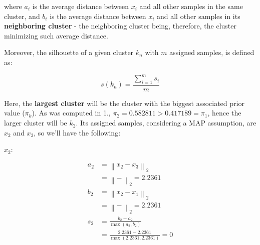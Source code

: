 \documentclass[12pt]{article}
\begin{document}
\begin{enumerate}[leftmargin=\labelsep]
\begin{enumerate}[leftmargin=\labelsep]
                where $a_i$ is the average distance between $x_i$ and all other samples
                in the same cluster, and $b_i$ is the average distance between $x_i$ and all
                other samples in its \textbf{neighboring cluster} - the neighboring
                cluster being, therefore, the cluster minimizing such average distance.

                Moreover, the silhouette of a given cluster $k_n$ with $m$ assigned samples, is defined as:

                \begin{equation*}
                  s(k_n) = \frac{\sum_{i=1}^m s_i}{m}
                \end{equation*}

                Here, the \textbf{largest cluster} will be the cluster with the
                biggest associated prior value ($\pi_k$). As was computed in 1.,
                $\pi_2 = 0.582811 > 0.417189 = \pi_1$,
                hence the larger cluster will be $k_2$. Its assigned samples,
                considering a MAP assumption, are $x_2$ and $x_3$, so we'll have
                the following:

                \vspace*{0.5cm}

                \begin{paracol}{2}
                  \setlength{\columnseprule}{1pt}
                  \def\columnseprulecolor{\color{black}}
                  \centering

                  $x_2$:

                  \begin{equation*}
                    \begin{aligned}
                      a_2 & = \left\| x_2 - x_3 \right\|_2                                           \\
                          & = \left\|  -  \right\|_2
                      = 2.2361                                                                       \\
                      b_2 & = \left\| x_2 - x_1 \right\|_2                                           \\
                          & = \left\|  -  \right\|_2
                      = 2.2361                                                                       \\
                      s_2 & = \frac{b_2 - a_2}{\max(a_2, b_2)}                                       \\
                          & = \frac{2.2361 - 2.2361}{\max(2.2361, 2.2361)} = 0
                    \end{aligned}
                  \end{equation*}


\end{paracol}
\end{enumerate}
\end{enumerate}
\end{document}

